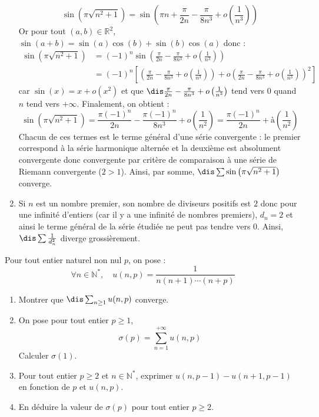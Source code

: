 \documentclass[a4paper,10pt]{report}
\begin{document}
\begin{enumerate}
$$\sin \left({\pi \sqrt {n^2 + 1}} \right)  = \sin \left(  \pi n + \frac{\pi}{2n} - \frac{\pi}{8n^3} +  o \left( \frac{1}{n^3} \right) \right)$$
Or pour tout $(a,b) \in \mathbb{R}^2$, $\sin(a+b)= \sin(a)\cos(b)+\sin(b) \cos(a)$ donc :
\begin{align*}
 \sin \left({\pi \sqrt {n^2 + 1}} \right)& = (-1)^n \sin \left(\frac{\pi}{2n} - \frac{\pi}{8n^3} +  o \left( \frac{1}{n^3} \right) \right) \\
 & = (-1)^n \left[\left(\frac{\pi}{2n} - \frac{\pi}{8n^3} +  o \left( \frac{1}{n^3} \right) \right) + o \left(\frac{\pi}{2n} - \frac{\pi}{8n^3} +  o \left( \frac{1}{n^3} \right) \right)^2 \right] 
 \end{align*}
car $\sin(x) =x + o(x^2)$ et que $\dis \frac{\pi}{2n} - \frac{\pi}{8n^3} +  o \left( \frac{1}{n^3} \right)$ tend vers $0$ quand $n$ tend vers $+ \infty$. Finalement, on obtient :
$$ \sin \left({\pi \sqrt {n^2 + 1}} \right) = \frac{\pi (-1)^n}{2n} - \frac{\pi (-1)^n}{8n^3} +  o \left( \frac{1}{n^2} \right) = \frac{\pi (-1)^n}{2n} +  à \left( \frac{1}{n^2} \right)$$
Chacun de ces termes est le terme général d'une série convergente : le premier correspond à la série harmonique alternée et la deuxième est absolument convergente donc convergente par critère de comparaison à une série de Riemann convergente ($2>1$). Ainsi, par somme, $\dis \sum \sin \left({\pi \sqrt {n^2 + 1}} \right)$ converge.
\item Si $n$ est un nombre premier, son nombre de diviseurs positifs est $2$ donc pour une infinité d'entiers (car il y a une infinité de nombres premiers), $d_n=2$ et ainsi le terme général de la série étudiée ne peut pas tendre vers $0$. Ainsi, $\dis \sum \frac{1}{d_n^2}$ diverge grossièrement.
\end{enumerate}

\begin{Exa} Pour tout entier naturel non nul $p$, on pose :
$$ \forall n \in \mathbb{N}^*, \quad u(n,p) = \frac{1}{n(n+1)\cdots(n+p)}$$

\begin{enumerate}
\item Montrer que $\dis \sum_{n \geq 1} u(n,p)$ converge.
\item On pose pour tout entier $p \geq 1$,
$$ \sigma(p) = \sum_{n=1}^{+ \infty} u(n,p)$$
Calculer $\sigma(1)$.
\item Pour tout entier $p \geq 2$ et $n \in \mathbb{N}^*$, exprimer $u(n,p-1)-u(n+1,p-1)$ en fonction de $p$ et $u(n,p)$.
\item En déduire la valeur de $\sigma(p)$ pour tout entier $p \geq 2$.
\end{enumerate}
\end{Exa}
\end{document}
